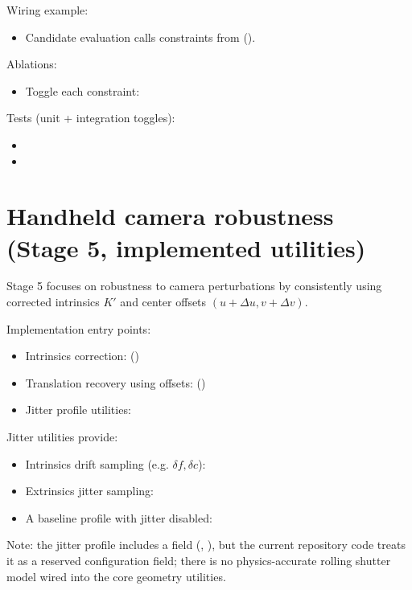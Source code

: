 Wiring example:
\begin{itemize}
  \item Candidate evaluation calls constraints from  ().
\end{itemize}

Ablations:
\begin{itemize}
  \item Toggle each constraint: 
\end{itemize}

Tests (unit + integration toggles):
\begin{itemize}
  \item {}
  \item {}
\end{itemize}

\section{Handheld camera robustness (Stage 5, implemented utilities)}
Stage 5 focuses on robustness to camera perturbations by consistently using corrected intrinsics $K'$ and
center offsets $(u+\Delta u, v+\Delta v)$.

Implementation entry points:
\begin{itemize}
  \item Intrinsics correction:  ()
  \item Translation recovery using offsets:  ()
  \item Jitter profile utilities: 
\end{itemize}

Jitter utilities provide:
\begin{itemize}
  \item Intrinsics drift sampling (e.g. $\delta f,\delta c$): 
  \item Extrinsics jitter sampling: 
  \item A baseline profile with jitter disabled: 
\end{itemize}

Note: the jitter profile includes a  field (, ), but the current
repository code treats it as a reserved configuration field; there is no physics-accurate rolling shutter model wired into
the core geometry utilities.

